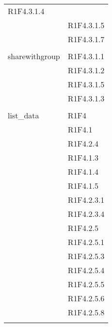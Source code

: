 \begin{center}
\begin{longtable}{|p{7cm}|p{7cm}|}
R1F4.3.1.4 \\ & R1F4.3.1.5 \\ & R1F4.3.1.7 \\ & \\ \hline
		sharewithgroup & R1F4.3.1.1 \\ & R1F4.3.1.2 \\ & R1F4.3.1.5 \\ & R1F4.3.1.3 \\ & \\ \hline
		list\_data & R1F4 \\ & R1F4.1 \\ & R1F4.2.4 \\ & R1F4.1.3 \\ & R1F4.1.4 \\ & R1F4.1.5 \\ & R1F4.2.3.1 \\ & R1F4.2.3.4 \\ & R1F4.2.5 \\ & R1F4.2.5.1 \\ & R1F4.2.5.3 \\ & R1F4.2.5.4 \\ & R1F4.2.5.5 \\ & R1F4.2.5.6 \\ & R1F4.2.5.8 \\ & \\ \hline

\end{longtable}
\end{center}
